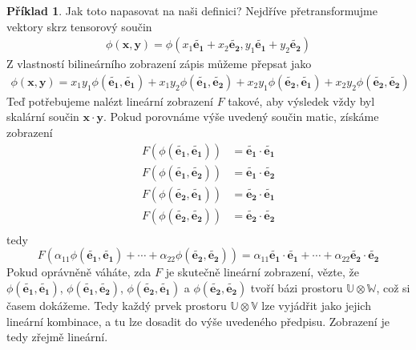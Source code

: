 \documentclass[a5paper,12pt]{amsbook}
\theoremstyle{definition}
\newtheorem{example}{Příklad}[chapter]
\newcommand{\myvec}[1]{\mathbf{#1}}
\newcommand{\myspace}[1]{\mathbb{#1}}
\begin{document}
\begin{example}
Jak toto napasovat na naši definici? Nejdříve přetransformujme vektory skrz tensorový součin
\begin{equation*}
\begin{split}
\phi(\myvec{x}, \myvec{y}) = \phi(x_1\myvec{\widetilde{e_1}} + x_2\myvec{\widetilde{e_2}},
  y_1\myvec{\widetilde{e_1}} + y_2\myvec{\widetilde{e_2}})
\end{split}
\end{equation*}
Z vlastností bilineárního zobrazení zápis můžeme přepsat jako
\begin{equation*}
\begin{split}
\phi(\myvec{x}, \myvec{y}) =
  x_1 y_1 \phi(\myvec{\widetilde{e_1}}, \myvec{\widetilde{e_1}})
  + x_1 y_2 \phi(\myvec{\widetilde{e_1}}, \myvec{\widetilde{e_2}})
  + x_2 y_1 \phi(\myvec{\widetilde{e_2}}, \myvec{\widetilde{e_1}})
  + x_2 y_2 \phi(\myvec{\widetilde{e_2}}, \myvec{\widetilde{e_2}})
\end{split}
\end{equation*}
Teď potřebujeme nalézt lineární zobrazení $F$ takové, aby výsledek vždy byl skalární
součin $\myvec{x}\cdot\myvec{y}$. Pokud porovnáme výše uvedený součin matic, získáme
zobrazení
\begin{equation*}
\begin{split}
F(\phi(\myvec{\widetilde{e_1}}, \myvec{\widetilde{e_1}})) &=
    \myvec{\widetilde{e_1}}\cdot\myvec{\widetilde{e_1}} \\
F(\phi(\myvec{\widetilde{e_1}}, \myvec{\widetilde{e_2}})) &=
    \myvec{\widetilde{e_1}}\cdot\myvec{\widetilde{e_2}} \\
F(\phi(\myvec{\widetilde{e_2}}, \myvec{\widetilde{e_1}})) &=
    \myvec{\widetilde{e_2}}\cdot\myvec{\widetilde{e_1}} \\
F(\phi(\myvec{\widetilde{e_2}}, \myvec{\widetilde{e_2}})) &=
    \myvec{\widetilde{e_2}}\cdot\myvec{\widetilde{e_2}} \\
\end{split}
\end{equation*}
tedy
\begin{equation*}
F(\alpha_{11}\phi(\myvec{\widetilde{e_1}}, \myvec{\widetilde{e_1}}) + \cdots 
  + \alpha_{22}\phi(\myvec{\widetilde{e_2}}, \myvec{\widetilde{e_2}})) 
= \alpha_{11}\myvec{\widetilde{e_1}}\cdot\myvec{\widetilde{e_1}} + \cdots
  + \alpha_{22}\myvec{\widetilde{e_2}}\cdot\myvec{\widetilde{e_2}}
\end{equation*}
Pokud oprávněně váháte, zda $F$ je skutečně lineární zobrazení, vězte, že
$\phi(\myvec{\widetilde{e_1}}, \myvec{\widetilde{e_1}})$, 
$\phi(\myvec{\widetilde{e_1}}, \myvec{\widetilde{e_2}})$,
$\phi(\myvec{\widetilde{e_2}}, \myvec{\widetilde{e_1}})$ a
$\phi(\myvec{\widetilde{e_2}}, \myvec{\widetilde{e_2}})$ tvoří bázi prostoru
$\myspace{U}\otimes\myspace{W}$, což si časem dokážeme. Tedy každý prvek prostoru
$\myspace{U}\otimes\myspace{V}$ lze vyjádřit jako jejich lineární kombinace,
a tu lze dosadit do výše uvedeného předpisu. Zobrazení je tedy zřejmě lineární.


\end{example}
\end{document}
